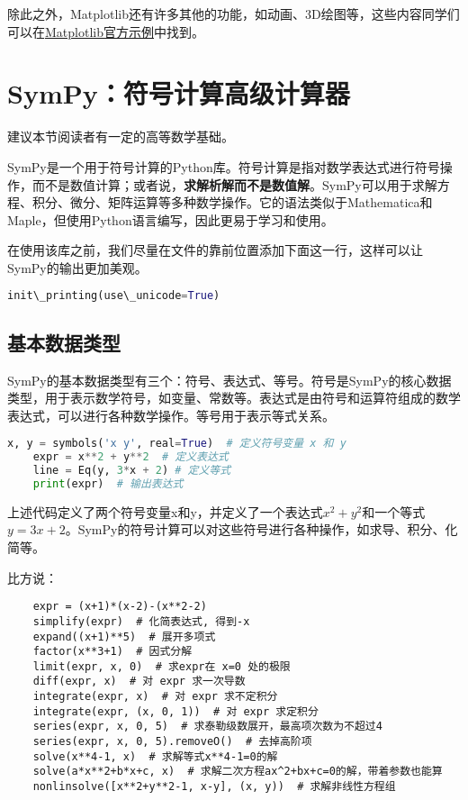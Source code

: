 \documentclass[../main.tex]{subfiles}
\begin{document}
除此之外，Matplotlib还有许多其他的功能，如动画、3D绘图等，这些内容同学们可以在\href{https://matplotlib.org/stable/gallery/index.html}{Matplotlib官方示例}中找到。

\section{SymPy：符号计算高级计算器}

\begin{flushright}
  { \kaishu 建议本节阅读者有一定的高等数学基础。}
\end{flushright}

SymPy是一个用于符号计算的Python库。符号计算是指对数学表达式进行符号操作，而不是数值计算；或者说，\textbf{求解析解而不是数值解}。SymPy可以用于求解方程、积分、微分、矩阵运算等多种数学操作。它的语法类似于Mathematica和Maple，但使用Python语言编写，因此更易于学习和使用。

在使用该库之前，我们尽量在文件的靠前位置添加下面这一行，这样可以让SymPy的输出更加美观。
\begin{lstlisting}[language=python]
  init\_printing(use\_unicode=True)
\end{lstlisting}

\subsection{基本数据类型}
SymPy的基本数据类型有三个：符号、表达式、等号。符号是SymPy的核心数据类型，用于表示数学符号，如变量、常数等。表达式是由符号和运算符组成的数学表达式，可以进行各种数学操作。等号用于表示等式关系。
\begin{lstlisting}[language=python]
    x, y = symbols('x y', real=True)  # 定义符号变量 x 和 y
    expr = x**2 + y**2  # 定义表达式
    line = Eq(y, 3*x + 2) # 定义等式
    print(expr)  # 输出表达式
\end{lstlisting}
上述代码定义了两个符号变量x和y，并定义了一个表达式$x^2 + y^2$和一个等式$y = 3x + 2$。SymPy的符号计算可以对这些符号进行各种操作，如求导、积分、化简等。

比方说：
\begin{lstlisting}
    expr = (x+1)*(x-2)-(x**2-2)
    simplify(expr)  # 化简表达式, 得到-x
    expand((x+1)**5)  # 展开多项式
    factor(x**3+1)  # 因式分解
    limit(expr, x, 0)  # 求expr在 x=0 处的极限
    diff(expr, x)  # 对 expr 求一次导数
    integrate(expr, x)  # 对 expr 求不定积分
    integrate(expr, (x, 0, 1))  # 对 expr 求定积分
    series(expr, x, 0, 5)  # 求泰勒级数展开，最高项次数为不超过4
    series(expr, x, 0, 5).removeO()  # 去掉高阶项
    solve(x**4-1, x)  # 求解等式x**4-1=0的解
    solve(a*x**2+b*x+c, x)  # 求解二次方程ax^2+bx+c=0的解，带着参数也能算
    nonlinsolve([x**2+y**2-1, x-y], (x, y))  # 求解非线性方程组
\end{lstlisting}
\end{document}
